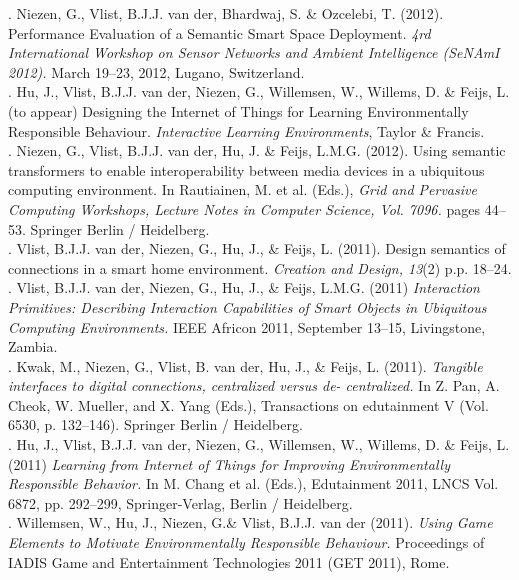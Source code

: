 . Niezen, G., Vlist, B.J.J. van der, Bhardwaj, S. \& Ozcelebi, T. (2012). Performance Evaluation of a Semantic Smart Space Deployment. \emph{4rd International Workshop on Sensor Networks and Ambient Intelligence (SeNAmI 2012).} March 19--23, 2012, Lugano, Switzerland.\\

. Hu, J., Vlist, B.J.J. van der, Niezen, G., Willemsen, W., Willems, D. \& Feijs, L. (to appear) Designing the Internet of Things for Learning Environmentally Responsible Behaviour. \emph{Interactive Learning Environments}, Taylor \& Francis.\\

. Niezen, G., Vlist, B.J.J. van der, Hu, J. \& Feijs, L.M.G. (2012). Using semantic transformers to enable interoperability between media devices in a ubiquitous computing environment. In Rautiainen, M. et al. (Eds.), \emph{Grid and Pervasive Computing Workshops, Lecture Notes in Computer Science, Vol. 7096.} pages 44--53. Springer Berlin / Heidelberg.\\

. Vlist, B.J.J. van der, Niezen, G., Hu, J., \& Feijs, L. (2011). Design semantics of connections in a smart home environment. \emph{Creation and Design, 13}(2) p.p. 18--24.\\

. Vlist, B.J.J. van der, Niezen, G., Hu, J., \& Feijs, L.M.G. (2011) \emph{Interaction Primitives: Describing Interaction Capabilities of Smart Objects in Ubiquitous Computing Environments.} IEEE Africon 2011, September 13--15, Livingstone, Zambia.\\

. Kwak, M., Niezen, G., Vlist, B. van der, Hu, J., \& Feijs, L. (2011). \emph{Tangible interfaces to digital connections, centralized versus de- centralized.} In Z. Pan, A. Cheok, W. Mueller, and X. Yang (Eds.), Transactions on edutainment V (Vol. 6530, p. 132--146). Springer Berlin / Heidelberg.\\

. Hu, J., Vlist, B.J.J. van der, Niezen, G., Willemsen, W., Willems, D. \& Feijs, L. (2011) \emph{ Learning from Internet of Things for Improving Environmentally Responsible Behavior.} In M. Chang et al. (Eds.), Edutainment 2011, LNCS Vol. 6872, pp. 292--299, Springer-Verlag, Berlin / Heidelberg.\\

. Willemsen, W., Hu, J., Niezen, G.\& Vlist, B.J.J. van der (2011). \emph{Using Game Elements to Motivate Environmentally Responsible Behaviour.} Proceedings of IADIS Game and Entertainment Technologies 2011 (GET 2011), Rome.\\

